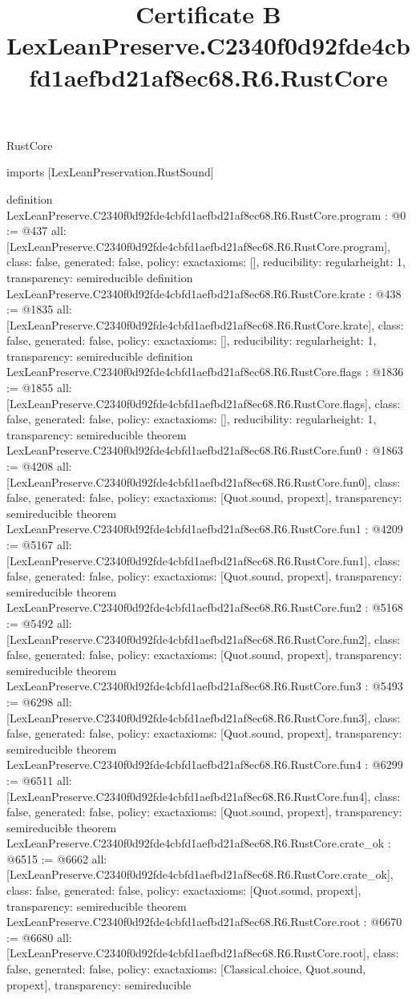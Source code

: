 \begin{lexlean}{RustCore}
\title{Certificate B LexLeanPreserve.C2340f0d92fde4cbfd1aefbd21af8ec68.R6.RustCore}
\begin{coremodule}
imports [LexLeanPreservation.RustSound]

definition LexLeanPreserve.C2340f0d92fde4cbfd1aefbd21af8ec68.R6.RustCore.program : @0 := @437 {
  all: [LexLeanPreserve.C2340f0d92fde4cbfd1aefbd21af8ec68.R6.RustCore.program],
  class: false,
  generated: false,
  policy: exact{axioms: []},
  reducibility: regular{height: 1},
  transparency: semireducible
}
definition LexLeanPreserve.C2340f0d92fde4cbfd1aefbd21af8ec68.R6.RustCore.krate : @438 := @1835 {
  all: [LexLeanPreserve.C2340f0d92fde4cbfd1aefbd21af8ec68.R6.RustCore.krate],
  class: false,
  generated: false,
  policy: exact{axioms: []},
  reducibility: regular{height: 1},
  transparency: semireducible
}
definition LexLeanPreserve.C2340f0d92fde4cbfd1aefbd21af8ec68.R6.RustCore.flags : @1836 := @1855 {
  all: [LexLeanPreserve.C2340f0d92fde4cbfd1aefbd21af8ec68.R6.RustCore.flags],
  class: false,
  generated: false,
  policy: exact{axioms: []},
  reducibility: regular{height: 1},
  transparency: semireducible
}
theorem LexLeanPreserve.C2340f0d92fde4cbfd1aefbd21af8ec68.R6.RustCore.fun0 : @1863 := @4208 {
  all: [LexLeanPreserve.C2340f0d92fde4cbfd1aefbd21af8ec68.R6.RustCore.fun0],
  class: false,
  generated: false,
  policy: exact{axioms: [Quot.sound, propext]},
  transparency: semireducible
}
theorem LexLeanPreserve.C2340f0d92fde4cbfd1aefbd21af8ec68.R6.RustCore.fun1 : @4209 := @5167 {
  all: [LexLeanPreserve.C2340f0d92fde4cbfd1aefbd21af8ec68.R6.RustCore.fun1],
  class: false,
  generated: false,
  policy: exact{axioms: [Quot.sound, propext]},
  transparency: semireducible
}
theorem LexLeanPreserve.C2340f0d92fde4cbfd1aefbd21af8ec68.R6.RustCore.fun2 : @5168 := @5492 {
  all: [LexLeanPreserve.C2340f0d92fde4cbfd1aefbd21af8ec68.R6.RustCore.fun2],
  class: false,
  generated: false,
  policy: exact{axioms: [Quot.sound, propext]},
  transparency: semireducible
}
theorem LexLeanPreserve.C2340f0d92fde4cbfd1aefbd21af8ec68.R6.RustCore.fun3 : @5493 := @6298 {
  all: [LexLeanPreserve.C2340f0d92fde4cbfd1aefbd21af8ec68.R6.RustCore.fun3],
  class: false,
  generated: false,
  policy: exact{axioms: [Quot.sound, propext]},
  transparency: semireducible
}
theorem LexLeanPreserve.C2340f0d92fde4cbfd1aefbd21af8ec68.R6.RustCore.fun4 : @6299 := @6511 {
  all: [LexLeanPreserve.C2340f0d92fde4cbfd1aefbd21af8ec68.R6.RustCore.fun4],
  class: false,
  generated: false,
  policy: exact{axioms: [Quot.sound, propext]},
  transparency: semireducible
}
theorem LexLeanPreserve.C2340f0d92fde4cbfd1aefbd21af8ec68.R6.RustCore.crate_ok : @6515 := @6662 {
  all: [LexLeanPreserve.C2340f0d92fde4cbfd1aefbd21af8ec68.R6.RustCore.crate_ok],
  class: false,
  generated: false,
  policy: exact{axioms: [Quot.sound, propext]},
  transparency: semireducible
}
theorem LexLeanPreserve.C2340f0d92fde4cbfd1aefbd21af8ec68.R6.RustCore.root : @6670 := @6680 {
  all: [LexLeanPreserve.C2340f0d92fde4cbfd1aefbd21af8ec68.R6.RustCore.root],
  class: false,
  generated: false,
  policy: exact{axioms: [Classical.choice, Quot.sound, propext]},
  transparency: semireducible
}


\end{coremodule}
\end{lexlean}
